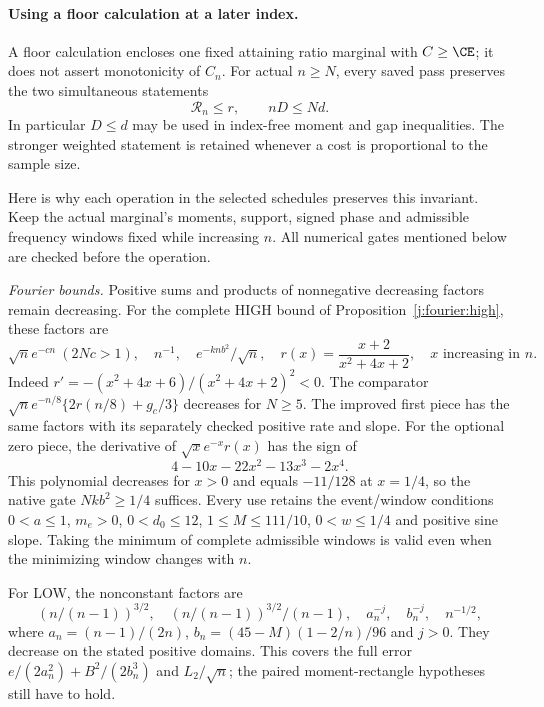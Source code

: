 \paragraph{Using a floor calculation at a later index.}
\label{j:local:transfer}
A floor calculation encloses one fixed attaining ratio marginal with
$C\ge\CE$; it does not assert monotonicity of $C_n$. For actual
$n\ge N$, every saved pass
preserves the two simultaneous statements
\begin{equation}\label{j:local:ext:floor-invariant}
 \mathcal R_n\le r,\qquad nD\le Nd.
\end{equation}
In particular $D\le d$ may be used in index-free moment and gap
inequalities. The stronger weighted statement is retained whenever a
cost is proportional to the sample size.

Here is why each operation in the selected schedules preserves this
invariant. Keep the actual marginal's moments, support, signed phase
and admissible frequency windows fixed while increasing $n$.
All numerical gates mentioned below are checked before the operation.

\emph{Fourier bounds.} Positive sums and products of nonnegative
decreasing factors remain decreasing. For the complete HIGH bound
of Proposition~\ref{j:fourier:high}, these factors are
\[
 \sqrt n e^{-cn}\ (2Nc>1),\quad n^{-1},\quad
 e^{-knb^2}/\sqrt n,\quad
 r(x)=\frac{x+2}{x^2+4x+2},\quad x\text{ increasing in }n.
\]
Indeed $r'=-(x^2+4x+6)/(x^2+4x+2)^2<0$.
The comparator $\sqrt n e^{-n/8}\{2r(n/8)+g_c/3\}$ decreases
for $N\ge5$. The improved first piece has the same factors with
its separately checked positive rate and slope. For the optional zero
piece, the derivative of $\sqrt{x}e^{-x}r(x)$ has the sign of
\[
 4-10x-22x^2-13x^3-2x^4.
\]
This polynomial decreases for $x>0$ and equals $-11/128$ at
$x=1/4$, so the native gate $Nkb^2\ge1/4$ suffices. Every use
retains the event/window conditions $0<a\le1$, $m_e>0$,
$0<d_0\le12$, $1\le M\le111/10$, $0<w\le1/4$ and positive
sine slope. Taking the minimum of complete admissible windows is
valid even when the minimizing window changes with $n$.

For LOW, the nonconstant factors are
\[
 (n/(n-1))^{3/2},\quad (n/(n-1))^{3/2}/(n-1),\quad
 a_n^{-j},\quad b_n^{-j},\quad n^{-1/2},
\]
where $a_n=(n-1)/(2n)$, $b_n=(45-M)(1-2/n)/96$ and $j>0$.
They decrease on the stated positive domains. This covers the full
error $e/(2a_n^2)+B^2/(2b_n^3)$ and $L_2/\sqrt n$; the paired
moment-rectangle hypotheses still have to hold.

